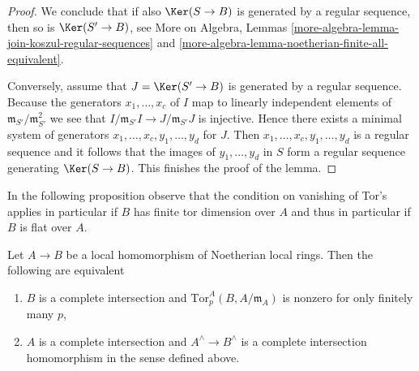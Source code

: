 \begin{proof}
\medskip\noindent
We conclude that if also $\Ker(S \to B)$ is generated by a
regular sequence, then so is $\Ker(S' \to B)$, see
More on Algebra, Lemmas
\ref{more-algebra-lemma-join-koszul-regular-sequences} and
\ref{more-algebra-lemma-noetherian-finite-all-equivalent}.

\medskip\noindent
Conversely, assume that $J = \Ker(S' \to B)$ is generated
by a regular sequence. Because the generators $x_1, \ldots, x_c$
of $I$ map to linearly independent elements of
$\mathfrak m_{S'}/\mathfrak m_{S'}^2$ we see that
$I/\mathfrak m_{S'}I \to J/\mathfrak m_{S'}J$ is injective.
Hence there exists a minimal system of generators
$x_1, \ldots, x_c, y_1, \ldots, y_d$ for $J$.
Then $x_1, \ldots, x_c, y_1, \ldots, y_d$ is a regular sequence
and it follows that the images of $y_1, \ldots, y_d$ in $S$
form a regular sequence generating $\Ker(S \to B)$.
This finishes the proof of the lemma.
\end{proof}

\noindent
In the following proposition observe that the condition on vanishing of
Tor's applies in particular if $B$ has finite tor dimension over $A$ and
thus in particular if $B$ is flat over $A$.

\begin{proposition}
\label{proposition-avramov-map}
Let $A \to B$ be a local homomorphism of Noetherian local rings.
Then the following are equivalent
\begin{enumerate}
\item $B$ is a complete intersection and
$\text{Tor}^A_p(B, A/\mathfrak m_A)$ is nonzero for only finitely many $p$,
\item $A$ is a complete intersection and
$A^\wedge \to B^\wedge$ is a complete intersection homomorphism
in the sense defined above.
\end{enumerate}
\end{proposition}


